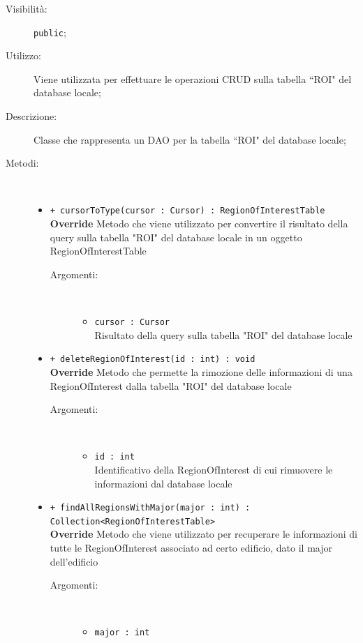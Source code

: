 \documentclass[../DefinizioneDiProdotto.tex]{subfiles}
\begin{document}
\begin{description}
\begin{itemize}
\end{itemize}
\item[Visibilità:] \texttt{public};
\item[Utilizzo:] Viene utilizzata per effettuare le operazioni CRUD sulla tabella “ROI" del database locale;
\item[Descrizione:] Classe che rappresenta un DAO per la tabella “ROI" del database locale;
\item[Metodi:] \
\begin{itemize}
\item \texttt{+ cursorToType(cursor : Cursor) : RegionOfInterestTable}\\
\textbf{Override} Metodo che viene utilizzato per convertire il risultato della query sulla tabella "ROI" del database locale in un oggetto RegionOfInterestTable
 \begin{description}
\item[Argomenti:] \
\begin{itemize}
\item \texttt{cursor : Cursor}\\
Risultato della query sulla tabella "ROI" del database locale\end{itemize}
\end{description}
\item \texttt{+ deleteRegionOfInterest(id : int) : void}\\
\textbf{Override} Metodo che permette la rimozione delle informazioni di una RegionOfInterest dalla tabella "ROI" del database locale
 \begin{description}
\item[Argomenti:] \
\begin{itemize}
\item \texttt{id : int}\\
Identificativo della RegionOfInterest di cui rimuovere le informazioni dal database locale\end{itemize}
\end{description}
\item \texttt{+ findAllRegionsWithMajor(major : int) : Collection<RegionOfInterestTable>}\\
\textbf{Override} Metodo che viene utilizzato per recuperare le informazioni di tutte le RegionOfInterest associato ad certo edificio, dato il major dell'edificio
 \begin{description}
\item[Argomenti:] \
\begin{itemize}
\item \texttt{major : int}\\

\end{itemize}
\end{description}
\end{itemize}
\end{description}
\end{document}
